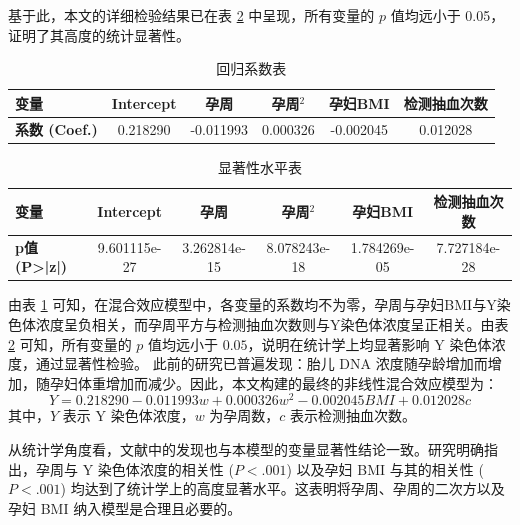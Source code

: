 基于此，本文的详细检验结果已在表 \ref{tab:pvalues} 中呈现，所有变量的 $p$ 值均远小于 0.05，证明了其高度的统计显著性。

\begin{table}[H]
    \centering
    \caption{回归系数表}
    \label{tab:coefficients}
    \begin{tabular}{lccccc}
        \toprule
        \textbf{变量}         & \textbf{Intercept} & \textbf{孕周} & \textbf{孕周$^2$} & \textbf{孕妇BMI} & \textbf{检测抽血次数} \\
        \midrule
        \textbf{系数 (Coef.)} & 0.218290           & -0.011993   & 0.000326        & -0.002045      & 0.012028        \\
        \bottomrule
    \end{tabular}
\end{table}

\begin{table}[H]
    \centering
    \caption{显著性水平表}
    \label{tab:pvalues}
    \begin{tabular}{lccccc}
        \toprule
        \textbf{变量}         & \textbf{Intercept} & \textbf{孕周}  & \textbf{孕周$^2$} & \textbf{孕妇BMI} & \textbf{检测抽血次数} \\
        \midrule
        \textbf{p值 (P>|z|)} & 9.601115e-27       & 3.262814e-15 & 8.078243e-18    & 1.784269e-05   & 7.727184e-28    \\
        \bottomrule
    \end{tabular}
\end{table}

由表 \ref{tab:coefficients} 可知，在混合效应模型中，各变量的系数均不为零，孕周与孕妇BMI与Y染色体浓度呈负相关，而孕周平方与检测抽血次数则与Y染色体浓度呈正相关。由表 \ref{tab:pvalues} 可知，所有变量的 $p$ 值均远小于 $0.05$，说明在统计学上均显著影响 Y 染色体浓度，通过显著性检验。
此前的研究已普遍发现：胎儿 DNA 浓度随孕龄增加而增加，随孕妇体重增加而减少。因此，本文构建的最终的非线性混合效应模型为：
\begin{equation}
    Y = 0.218290 - 0.011993 w + 0.000326 w^2 - 0.002045 BMI + 0.012028 c \label{eq:final_model}
\end{equation}
其中，$Y$ 表示 Y 染色体浓度，$w$ 为孕周数，$c$ 表示检测抽血次数。

从统计学角度看，文献中的发现也与本模型的变量显著性结论一致。研究明确指出，孕周与 Y 染色体浓度的相关性 ($P<.001$) 以及孕妇 BMI 与其的相关性 ($P<.001$) 均达到了统计学上的高度显著水平\cite{zhou2015effects}。这表明将孕周、孕周的二次方以及孕妇 BMI 纳入模型是合理且必要的。


